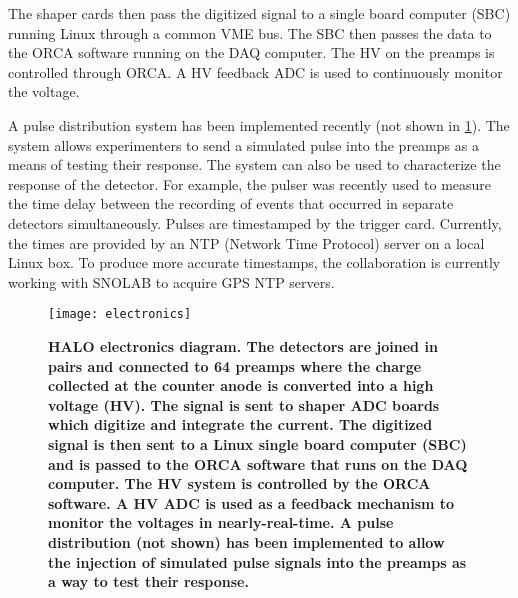 		The shaper cards then pass the digitized signal to a single board computer (SBC) running Linux through a common VME bus. The SBC then passes the data to the ORCA software running on the DAQ computer. The HV on the preamps is controlled through ORCA. A HV feedback ADC is used to continuously monitor the voltage. 

		A pulse distribution system has been implemented recently (not shown in \FIG \ref{fig:electronics}). The system allows experimenters to send a simulated pulse into the preamps as a means of testing their response. The system can also be used to characterize the response of the detector. For example, the pulser was recently used to measure the time delay between the recording of events that occurred in separate detectors simultaneously\cite{pulser_timing}. Pulses are timestamped by the trigger card. Currently, the times are provided by an NTP (Network Time Protocol) server on a local Linux box. To produce more accurate timestamps, the collaboration is currently working with SNOLAB to acquire GPS NTP servers. 
		\begin{figure}[H]
			\texttt{[image: electronics]}
			\caption[HALO Electronics]{\bf HALO electronics diagram. \rm The \he detectors are joined in pairs and connected to 64 preamps where the charge collected at the \he counter anode is converted into a high voltage (HV). The signal is sent to shaper ADC boards which digitize and integrate the current. The digitized signal is then sent to a Linux single board computer (SBC) and is passed to the ORCA software that runs on the DAQ computer. The HV system is controlled by the ORCA software. A HV ADC is used as a feedback mechanism to monitor the voltages in nearly-real-time. A pulse distribution (not shown) has been implemented to allow the injection of simulated pulse signals into the preamps as a way to test their response.}
			\label{fig:electronics}
		\end{figure}


